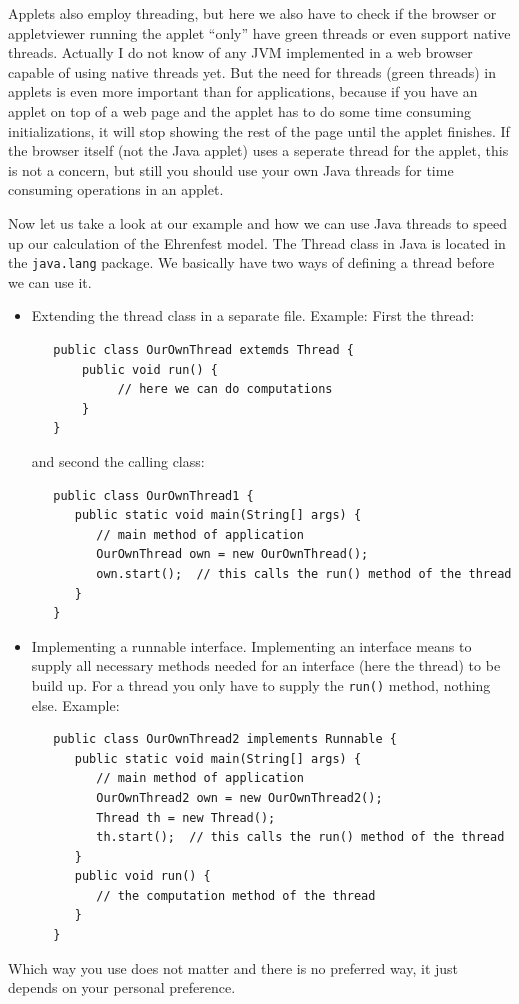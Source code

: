 Applets also employ threading, but here we also have to check if the
browser or appletviewer running the applet 
``only'' have green threads or even support native threads.
Actually I do not know of any JVM implemented in a web browser capable
of using native threads yet. But the need for threads (green threads)
in applets is even
more important than for applications, 
because if you have an applet on top of a web page and
the applet has to do some time consuming initializations, it will stop
showing the rest of the page until the applet finishes. If the browser
itself (not the Java applet) uses a seperate thread for the applet, 
this is not a concern, but
still you should use your own Java threads 
for time consuming operations in an applet.

Now let us take a look at our example and how we can use Java threads to
speed up our calculation of the Ehrenfest model. The Thread class in Java
is located in the \verb|java.lang| package. We basically have two 
ways of defining a thread before we can use it. 
\begin{itemize}
\item Extending the thread class in a separate file. Example:
First the thread:
\begin{small}
\begin{verbatim}
   public class OurOwnThread extemds Thread {       
       public void run() {
            // here we can do computations
       }
   }
\end{verbatim}
\end{small}
and second the calling class:
\begin{small}
\begin{verbatim}
   public class OurOwnThread1 {
      public static void main(String[] args) {
         // main method of application
         OurOwnThread own = new OurOwnThread();
         own.start();  // this calls the run() method of the thread
      }
   }       
\end{verbatim} 
\end{small}
\item Implementing a runnable interface. Implementing an interface means
  to supply all necessary methods needed for an interface (here the thread)
  to be build up. For a thread you only have to supply the \verb|run()| method,
  nothing else. Example:
\begin{small}
\begin{verbatim}
   public class OurOwnThread2 implements Runnable {
      public static void main(String[] args) {
         // main method of application
         OurOwnThread2 own = new OurOwnThread2();
         Thread th = new Thread();
         th.start();  // this calls the run() method of the thread
      }
      public void run() {
         // the computation method of the thread
      }
   }       
\end{verbatim}
\end{small}
\end{itemize}
Which way you use does not matter and there is no preferred way, it just
depends on your personal preference.

